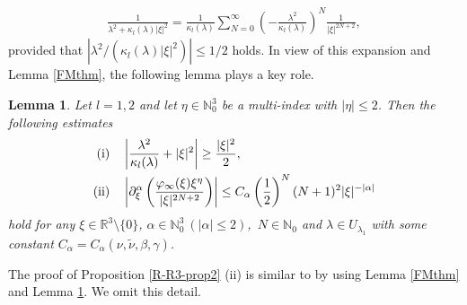 \documentclass[dvipdfmx,12pt]{article}
\newtheorem{lem}[dfn]{Lemma}
\begin{document}
\begin{gather*}
\frac{1}{\lambda^2+\kappa_l(\lambda)|\xi|^2}=\frac{1}{\kappa_l(\lambda)}\sum_{N=0}^\infty\left(-\frac{\lambda^2}{\kappa_l(\lambda)} \right)^N\frac{1}{|\xi|^{2N+2}},
\end{gather*}
provided that $|\lambda^2/(\kappa_l(\lambda)|\xi|^2)|\le 1/2$ holds.
In view of this expansion and Lemma \ref{FMthm}, the following lemma plays a key role. 
\begin{lem}\label{R-R3-lem4}
Let $l=1,2$ and let $\eta\in\mathbb{N}_0^3$ be a multi-index with $|\eta|\le 2$. Then the following estimates 
\begin{align*}
{\rm (i)}&\quad \left|\frac{\lambda^2}{\kappa_l(\lambda)}+|\xi|^2\right|\ge \frac{|\xi|^2}{2}, \\
{\rm (ii)}&\quad \left|\partial_\xi^\alpha\left(\frac{\varphi_\infty(\xi) \xi^\eta}{|\xi|^{2N+2}}\right)\right|\leq C_\alpha \left( \frac{1}{2}\right)^N (N+1)^2 |\xi|^{-|\alpha|}
\end{align*}
hold for any $\xi\in\mathbb{R}^3\setminus\{0\}$, $\alpha\in\mathbb{N}_0^3~(|\alpha|\le 2)$,~$N\in \mathbb{N}_0$ and $\lambda\in U_{\lambda_1}$ with some constant $C_\alpha=C_\alpha(\nu,\tilde{\nu},\beta,\gamma)$.
\end{lem}
The proof of Proposition \ref{R-R3-prop2} {\rm (ii)} is similar to \cite{SE18} by using Lemma \ref{FMthm} and Lemma \ref{R-R3-lem4}. We omit this detail.
\end{document}
